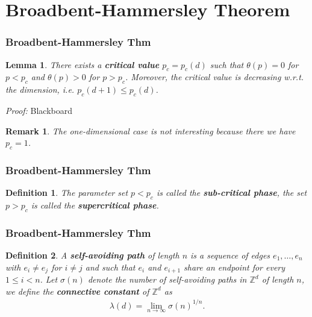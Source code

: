 \documentclass[compress,mathserif,serif]{beamer}
\newtheorem{Con}{Lemma}
\newtheorem{dfn}{Definition}
\newtheorem{rem}{Remark}
\begin{document}
\section{Broadbent-Hammersley Theorem}


\begin{frame}
\begin{center}
\Huge{}
\end{center}
\end{frame}


\begin{frame}
\frametitle{Broadbent-Hammersley Thm}

\begin{Con}There exists a \textbf{critical value} $p_c=p_c(d)$ such that $\theta(p)=0$ for $p<p_c$ and $\theta(p)>0$ for $p>p_c$. Moreover, the critical value is decreasing w.r.t. the dimension, i.e. $p_c(d+1) \leq p_c(d)$.
\end{Con}
\textit{Proof:} Blackboard
\pause
\begin{rem} The one-dimensional case is not interesting because there we have $p_c=1$.
\end{rem}
\end{frame}

\begin{frame}
\frametitle{Broadbent-Hammersley Thm}
\begin{dfn} The parameter set $p<p_c$ is called the \textbf{sub-critical phase}, the set $p > p_c$ is called the \textbf{supercritical phase}.
\end{dfn}
\end{frame}


\begin{frame}
\frametitle{Broadbent-Hammersley Thm}
\begin{dfn} A \textbf{self-avoiding path} of length $n$ is a sequence of edges $e_1, \dots ,  e_n$ with $e_i \neq e_j$ for $i \neq j$ and such that $e_i$ and $e_{i+1}$ share an endpoint for every $1 \leq i <n$. Let $\sigma(n)$ denote the number of self-avoiding paths in $\mathbb{Z}^d$ of length $n$, we define the \textbf{connective constant} of $\mathbb{Z}^d$ as 
\begin{align*}
\lambda(d) = \lim_{n \to \infty} \sigma(n)^{1/n}.
\end{align*}
\end{dfn}
\end{frame}
\end{document}
